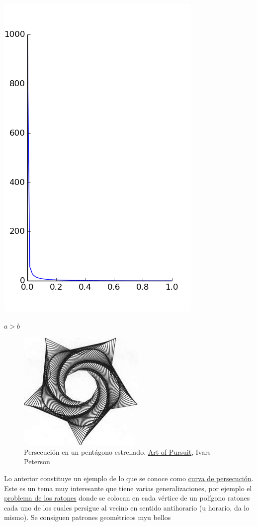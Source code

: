 \begin{center}
\includegraphics[scale=.3]{imagenes/perse_a_2_b_1.png}

$a>b$
\end{center}


\begin{figure}
\begin{center}
 \includegraphics[scale=.4]{imagenes/persecucion2.jpg}
 \caption{\small Persecución en un pentágono estrellado.
\href{https://www.sciencenews.org/article/art-pursuit-3}{Art of Pursuit},
Ivars Peterson
}
\end{center}
\end{figure}
Lo anterior constituye un ejemplo de lo que se conoce como \href{https://en.wikipedia.org/wiki/Pursuit_curve}{curva de persecución}. Este es un tema muy interesante que tiene varias generalizaciones, por ejemplo el \href{https://en.wikipedia.org/wiki/Mice_problem}{problema de los ratones} donde se colocan en cada vértice de un polígono ratones cada uno de los cuales persigue al vecino en sentido antihorario (u horario, da lo mismo). Se consiguen patrones geométricos myu bellos




